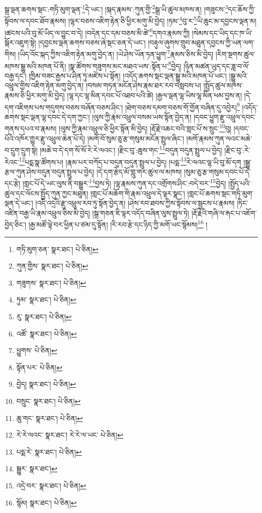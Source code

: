 སྒྲ་ལྡན་ཆགས་སྡང་:གཏི་མུག་ལྡན་\footnote{གཏི་མུག་ཅན་  སྣར་ཐང་།  པེ་ཅིན། }དེ་ཡང་། །སྐད་རྣམས་:ཀུན་གྱི་\footnote{ཀུན་གྱིས་  སྣར་ཐང་།  པེ་ཅིན། }སྒྲ་ཡི་ཚུལ་མཁས་ན། །གཟུངས་\footnote{གཟུགས་  སྣར་ཐང་།  པེ་ཅིན། }དང་ཆོས་ཀྱི་སྟོབས་ལ་དབང་ཐོབ་རྣམས། །ལྷར་བཅས་འཇིག་རྟེན་ཅི་ཕྱིར་མགུ་མི་བྱེད། །ཏམ་\footnote{ཏུམ་  སྣར་ཐང་།  པེ་ཅིན། }བུ་ར་\footnote{རུ་  སྣར་ཐང་།  པེ་ཅིན། }ཡི་ཆུང་མ་དབྱངས་ལྡན་མ། །ཚངས་པའི་བུ་མོ་ཡིད་ལ་བྱུང་བ་དེ། །བདེན་དང་དམ་བཅས་མི་ཚེ་\footnote{འཚོ་  སྣར་ཐང་།  པེ་ཅིན། }དགའ་རྣམས་ཀྱི། །སེམས་དང་ཡིད་དང་ཁ་ཡི་སྒོར་འཇུག་སྟེ། །དབྱངས་ལྡན་ཆགས་བཅས་ཞེ་སྡང་ཅན་དེ་ཡང་། །བརྟུལ་ཞུགས་གྲུབ་མཐུན་དབྱངས་ཀྱི་ཡན་ལག་གིས། །ཡིད་འོང་སྐད་ཀྱིས་འཇིག་རྟེན་མགུ་བྱེད་ན། །ཡེ་ཤེས་ཡོན་ཏན་ཕྱུག་\footnote{ཕྱུགས་  པེ་ཅིན། }རྣམས་ཅིས་མི་བྱེད། །རིག་སྔགས་ཚུལ་མཁས་སྒྱུ་མའི་མཁན་པོ་ནི། །སྣ་ཚོགས་གཟུགས་མང་མཐའ་ཡས་:སྟོན་པ་\footnote{སྟོན་པར་  པེ་ཅིན། }བྱེད། །ཉིན་མཚན་ཡུད་དང་ཟླ་བ་ལོ་བརྒྱ་དང་། །ཁྱིམ་བཟང་རྒྱས་པ་ཤིན་ཏུ་མཛེས་པ་སྟོན། །འདོད་ཆགས་སྡང་ལྡན་སྒྱུ་མའི་མཁན་པོ་ཡང་། །སྒྱུ་མའི་འཕྲུལ་གྱིས་འཇིག་རྟེན་མགུ་བྱེད་ན། །བསམ་གཏན་མངོན་ཤེས་རྣམ་ཐར་རབ་བསླབས་པ། །སྤྱོད་ཚུལ་མཁས་རྣམས་ཅི་ཕྱིར་མགུ་མི་བྱེད། །ལྷ་དང་ལྷ་མིན་དབང་པོ་འཐབ་པའི་ཚེ། །རྒྱལ་ལྡན་ལྷ་ཡིས་ལྷ་མིན་ཕམ་བྱས་ན། །དེ་དག་འཇིགས་པས་གདུགས་བཅས་བཞོན་བཅས་ཤིང་། །ཐེག་བཅས་དམག་བཅས་གོ་གྱོན་བཞིན་དུ་འབྱེར།\footnote{བྱེད།  སྣར་ཐང་།  པེ་ཅིན། } །འདོད་ཆགས་སྡང་ལྡན་ལྷ་དབང་དེ་དག་ཀྱང་། །ལུས་ཀྱི་རྣམ་འཕྲུལ་བསམ་ཡས་སྟོན་བྱེད་ན། །དབང་ཕྱུག་རྫུ་འཕྲུལ་དབང་གནས་དཔའ་བ་རྣམས། །ལུས་ཀྱི་རྣམ་འཕྲུལ་ཅི་ཕྱིར་སྟོན་མི་བྱེད། །རྡོ་རྗེ་འཆང་བའི་གླང་པོ་ས་སྲུང་\footnote{བསྲུང་  སྣར་ཐང་།  པེ་ཅིན། }བུ། །དབང་པོའི་འཁོར་གྱུར་རྫུ་འཕྲུལ་ཆེན་པོ་དེ། །མགོ་བོ་སུམ་ཅུ་རྩ་གསུམ་མངོན་སྤྲུལ་ཞིང་། །མགོ་རྣམས་ཀུན་ལའང་མཆེ་བ་དྲུག་དྲུག་སྟེ། །མཆེ་བ་དེ་དག་སོ་སོ་རེ་རེ་ལའང་། །རྫིང་བུ་:ཆུས་གང་\footnote{ཆུ་གང་  སྣར་ཐང་།  པེ་ཅིན། }བདུན་བདུན་སྤྲུལ་པ་བྱེད། །རྫིང་བུ་:རེ་རེའང་\footnote{རེ་རེ་ལའང་  སྣར་ཐང་། རེ་རེ་ལ་ཡང་  པེ་ཅིན། }པདྨ་སྣ་ཚོགས་པ། །རྣམ་པར་བཀོད་པ་བདུན་བདུན་སྤྲུལ་པ་བྱེད། །པདྨ་\footnote{པདྨ་རེ་  སྣར་ཐང་།  པེ་ཅིན། }རེ་ལའང་ལྷ་ཡི་བུ་མོ་དག །སྒྱུ་རྩལ་ཀུན་ཤེས་བདུན་བདུན་སྤྲུལ་པ་བྱེད། །དེ་དག་རྩེད་མོ་གླུ་གར་ཚུལ་ལ་མཁས། །སུམ་ཅུ་རྩ་གསུམ་དབང་པོ་དེ་དང་རྩེ། །གླང་པོ་དེ་ཡང་ལུས་ནི་བསྒྱུར་\footnote{སྒྱུར་  སྣར་ཐང་། }བྱས་ཏེ། །ལྷ་རྣམས་ཀུན་དང་འགྲོགས་ཤིང་:བདེ་བར་\footnote{འདྲེ་བར་  སྣར་ཐང་།  པེ་ཅིན། }བྱེད། །སྤྱོད་པའི་ཚུལ་དང་ལོངས་སྤྱོད་ཀུན་ཀྱང་མཐུན། །གླང་པོ་མཆོག་གི་རྣམ་འཕྲུལ་དེ་ལྟར་སྣང་། །གླང་པོ་ཆགས་སྡང་གཏི་མུག་ལྡན་དེ་ཡང་། །འདི་འདྲའི་རྫུ་འཕྲུལ་རབ་ཏུ་སྟོན་བྱེད་ན། །ཤེས་རབ་ཐབས་ཀྱིས་སྟོབས་ལ་སྦྱངས་པ་རྣམས། །ཏིང་འཛིན་བརྒྱ་ཡི་རྣམ་འཕྲུལ་ཅིས་མི་བྱེད། །སྒྲ་གཅན་ཇི་ལྟར་འདོད་བཞིན་ལུས་སྤྲུལ་ཏེ། །རྡོ་རྗེའི་གཞི་ལ་རྐང་པ་འཇོག་བྱེད་ཅིང་། །རྒྱ་མཚོ་ལྟེ་བར་ཕྱིན་པ་ཙམ་དུ་སྟོན། །རི་རབ་རྩེ་དང་ཉིད་ཀྱི་མགོ་ཡང་སྙོམས།\footnote{སྙོམ།  སྣར་ཐང་།  པེ་ཅིན། } །
